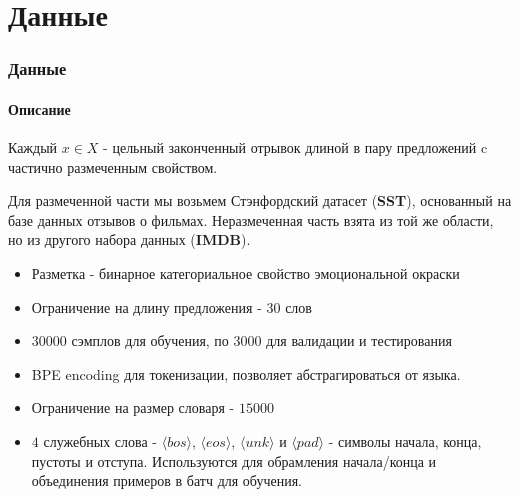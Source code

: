 \documentclass[10pt]{beamer}
\begin{document}
\section{Данные}
\begin{frame}
\frametitle{Данные}
\framesubtitle{Описание}


Каждый $x \in X$ - цельный законченный отрывок длиной в пару предложений c частично размеченным свойством. 

Для размеченной части мы возьмем Стэнфордский датасет (\textbf{SST}), основанный на базе данных отзывов о фильмах. Неразмеченная часть взята из той же области, но из другого набора данных (\textbf{IMDB}).

\newcommand{\bos}{\langle bos \rangle}
\newcommand{\eos}{\langle eos \rangle}
\newcommand{\unk}{\langle unk \rangle}
\newcommand{\pad}{\langle pad \rangle}

\begin{itemize}
    \item Разметка - бинарное категориальное свойство эмоциональной окраски
    \item Ограничение на длину предложения - $30$ слов
    \item $30000$ сэмплов для обучения, по $3000$ для валидации и тестирования
    \item BPE encoding для токенизации, позволяет абстрагироваться от языка.
    \item Ограничение на размер словаря - $15000$
    \item $4$ служебных слова - $\bos$, $\eos$, $\unk$ и $\pad$ - символы начала, конца, пустоты и отступа. Используются для обрамления начала/конца и объединения примеров в батч для обучения.
\end{itemize}

\end{frame}
\end{document}
